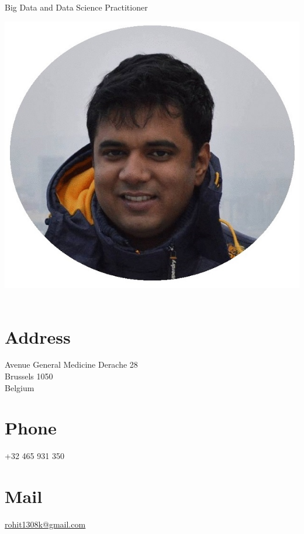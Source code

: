 \documentclass[]{cv-class}
\begin{document}
      {Big Data and Data Science Practitioner}

\vspace{1.15cm}

\begin{aside}
  \includegraphics[scale=0.30]{img/meg2.jpg}
    ~
  \vspace{0.65cm}
  \section{Address}
    Avenue General Medicine Derache 28\\
    Brussels 1050\\
    Belgium
    ~
  \section{Phone}
    +32 465 931 350
    ~
  \section{Mail}
    \underline{\href{mailto:rohit1308k@gmail.com}{rohit1308k@gmail.com}}
    ~
    ~

\end{aside}
\end{document}
